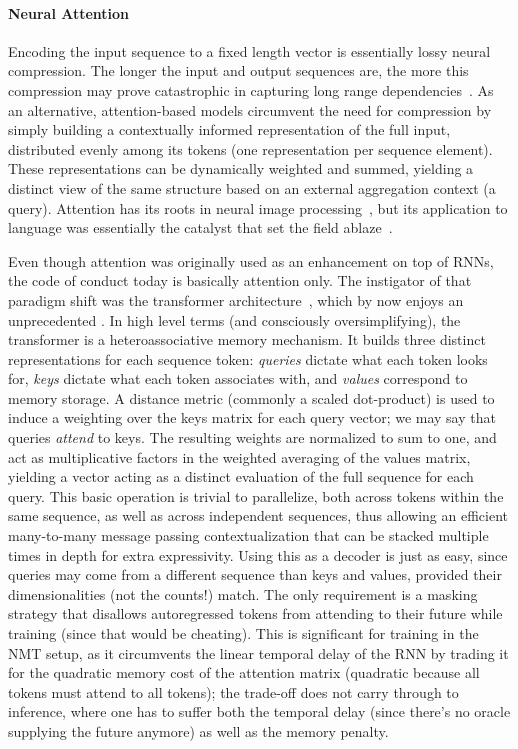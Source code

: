 \paragraph{Neural Attention}
Encoding the input sequence to a fixed length vector is essentially lossy neural compression.
The longer the input and output sequences are, the more this compression may prove catastrophic in capturing long range dependencies~\cite{cho2014properties}.
As an alternative, attention-based models circumvent the need for compression by simply building a contextually informed representation of the full input, distributed evenly among its tokens (one representation per sequence element).
These representations can be dynamically weighted and summed, yielding a distinct view of the same structure based on an external aggregation context (a query).
Attention has its roots in neural image processing~\cite[inter alia]{larochelle2010learning,NIPS2014_09c6c378}, but its application to language was essentially the catalyst that set the field ablaze~\cite{bahdanau2015neural}.

Even though attention was originally used as an enhancement on top of RNNs, the code of conduct today is basically attention only.
The instigator of that paradigm shift was the transformer architecture~\cite{vaswani2017attention}, which by now enjoys an unprecedented .
In high level terms (and consciously oversimplifying), the transformer is a heteroassociative memory mechanism.
It builds three distinct representations for each sequence token: \textit{queries} dictate what each token looks for, \textit{keys} dictate what each token associates with, and \textit{values} correspond to memory storage.
A distance metric (commonly a scaled dot-product) is used to induce a weighting over the keys matrix for each query vector; we may say that queries \textit{attend} to keys.
The resulting weights are normalized to sum to one, and act as multiplicative factors in the weighted averaging of the values matrix, yielding a vector acting as a distinct evaluation of the full sequence for each query.
This basic operation is trivial to parallelize, both across tokens within the same sequence, as well as across independent sequences, thus allowing an efficient many-to-many message passing contextualization that can be stacked multiple times in depth for extra expressivity.
Using this as a decoder is just as easy, since queries may come from a different sequence than keys and values, provided their dimensionalities (not the counts!) match.
The only requirement is a masking strategy that disallows autoregressed tokens from attending to their future while training (since that would be cheating).
This is significant for training in the NMT setup, as it circumvents the linear temporal delay of the RNN by trading it for the quadratic memory cost of the attention matrix (quadratic because all tokens must attend to all tokens); the trade-off does not carry through to inference, where one has to suffer both the temporal delay (since there's no oracle supplying the future anymore) as well as the memory penalty.

